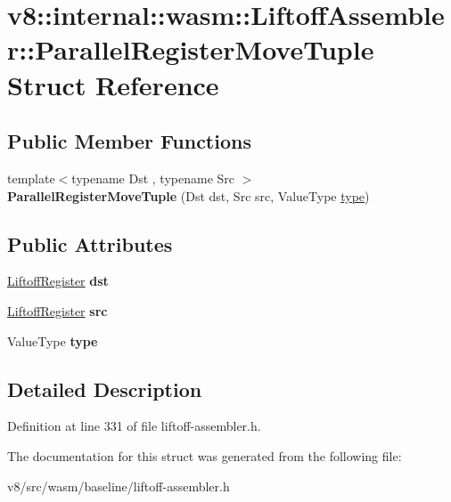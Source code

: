 \hypertarget{structv8_1_1internal_1_1wasm_1_1LiftoffAssembler_1_1ParallelRegisterMoveTuple}{}\section{v8\+:\+:internal\+:\+:wasm\+:\+:Liftoff\+Assembler\+:\+:Parallel\+Register\+Move\+Tuple Struct Reference}
\label{structv8_1_1internal_1_1wasm_1_1LiftoffAssembler_1_1ParallelRegisterMoveTuple}
\subsection*{Public Member Functions}
\begin{DoxyCompactItemize}
\item 
\mbox{\label{structv8_1_1internal_1_1wasm_1_1LiftoffAssembler_1_1ParallelRegisterMoveTuple_a116077a5d5168f3bbca1a00822b16844}} 
{\footnotesize template$<$typename Dst , typename Src $>$ }\\{\bfseries Parallel\+Register\+Move\+Tuple} (Dst dst, Src src, Value\+Type \mbox{\hyperlink{classstd_1_1conditional_1_1type}{type}})
\end{DoxyCompactItemize}
\subsection*{Public Attributes}
\begin{DoxyCompactItemize}
\item 
\mbox{\label{structv8_1_1internal_1_1wasm_1_1LiftoffAssembler_1_1ParallelRegisterMoveTuple_a5b9a5f689f38d581b5419ba2684333a4}} 
\mbox{\hyperlink{classv8_1_1internal_1_1wasm_1_1LiftoffRegister}{Liftoff\+Register}} {\bfseries dst}
\item 
\mbox{\label{structv8_1_1internal_1_1wasm_1_1LiftoffAssembler_1_1ParallelRegisterMoveTuple_ac00efd3b401233106ff359432d25ca16}} 
\mbox{\hyperlink{classv8_1_1internal_1_1wasm_1_1LiftoffRegister}{Liftoff\+Register}} {\bfseries src}
\item 
\mbox{\label{structv8_1_1internal_1_1wasm_1_1LiftoffAssembler_1_1ParallelRegisterMoveTuple_aaf95c76f9bbf245af3410718d8aa5bd7}} 
Value\+Type {\bfseries type}
\end{DoxyCompactItemize}


\subsection{Detailed Description}


Definition at line 331 of file liftoff-\/assembler.\+h.



The documentation for this struct was generated from the following file\+:\begin{DoxyCompactItemize}
\item 
v8/src/wasm/baseline/liftoff-\/assembler.\+h\end{DoxyCompactItemize}
